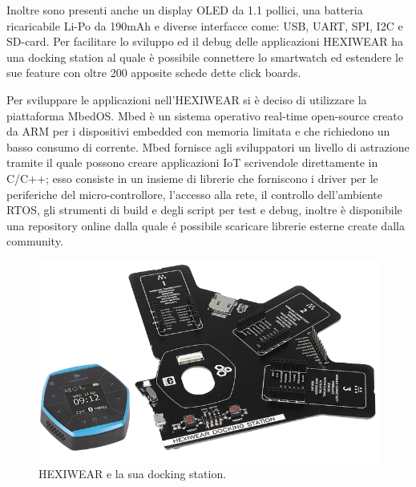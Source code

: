 Inoltre sono presenti anche un display OLED da 1.1 pollici, una batteria ricaricabile Li-Po da 190mAh e diverse interfacce come: USB, UART, SPI, I2C e SD-card.
Per facilitare lo sviluppo ed il debug delle applicazioni HEXIWEAR ha una docking station al quale è possibile connettere lo smartwatch ed estendere le sue feature con oltre 200 apposite schede dette click boards.

Per sviluppare le applicazioni nell'HEXIWEAR si è deciso di utilizzare la piattaforma MbedOS. Mbed è un sistema operativo real-time open-source creato da ARM per i dispositivi embedded con memoria limitata e che richiedono un basso consumo di corrente. 
Mbed fornisce agli sviluppatori un livello di astrazione tramite il quale possono creare applicazioni IoT scrivendole direttamente in C/C++; esso consiste in un insieme di librerie che forniscono i driver per le periferiche del micro-controllore, l'accesso alla rete, il controllo dell'ambiente RTOS, gli strumenti di build e degli script per test e debug, inoltre è disponibile una repository online dalla quale é possibile scaricare librerie esterne create dalla community.

\begin{figure}[!htb]
    \centering
    \includegraphics[width=.8\textwidth]{figure/hexiwear.png}
    \caption{HEXIWEAR e la sua docking station.}
    \label{fig:hexiwear}
\end{figure}